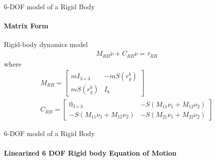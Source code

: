 


\begin{frame}{6-DOF model of a Rigid Body}
	\framesubtitle{Matrix Form}
	\begin{block}{Rigid-body dynamics model}
		\begin{align}
			M_{RB}\dot{\nu} + C_{RB}\nu = \tau_{RB}
		\end{align}
		where
		\begin{align}
			M_{RB} = \begin{bmatrix}
				mI_{3\times 3} & -mS(r_g^b) \\
				mS(r_g^b) & I_b
			\end{bmatrix} \\
			C_{RB} = \begin{bmatrix}
				0_{3\times 3} & -S(M_{11}\nu_1 + M_{12}\nu_2) \\
				-S(M_{11}\nu_1 + M_{12}\nu_2) & -S(M_{21}\nu_1 + M_{22}\nu_2)
			\end{bmatrix} 
		\end{align}
	\end{block}
\end{frame}







\begin{frame}{6-DOF model of a Rigid Body}
	\framesubtitle{Linearized 6 DOF Rigid body Equation of Motion}
	
	
\end{frame}




